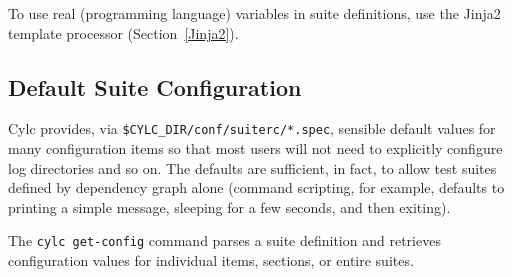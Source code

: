 To use real (programming language) variables in suite definitions, use the 
Jinja2 template processor (Section~\ref{Jinja2}).


\subsection{Default Suite Configuration}
\label{SuiteDefaults}

Cylc provides, via \lstinline=$CYLC_DIR/conf/suiterc/*.spec=, sensible
default values for many configuration items so that most users will not
need to explicitly configure log directories and so on. The defaults are
sufficient, in fact, to allow test suites defined by dependency graph
alone (command scripting, for example, defaults to printing a simple
message, sleeping for a few seconds, and then exiting). 

The \lstinline=cylc get-config= command parses a suite definition and
retrieves configuration values for individual items, sections, or entire
suites.

